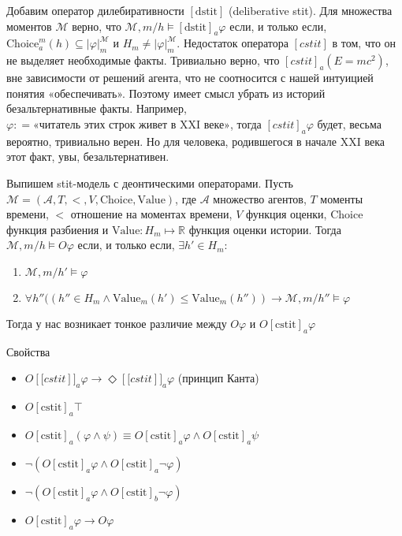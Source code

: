\documentclass[openany]{book}
\theoremstyle{plain}
\theoremstyle{definition}
\begin{document}
Добавим оператор дилебиративности \([\mathrm{dstit}]\) (deliberative stit). Для множества моментов \(\mathcal{M}\) верно, что \(\mathcal{M}, m/h \models [\mathrm{dstit}]_a \varphi\) если, и только если,  \(\mathrm{Choice}_a^m (h) \subseteq |\varphi|_m^{\mathcal{M}}\) и \(H_m \not=|\varphi|_m^{\mathcal{M}} \). Недостаток оператора \([cstit]\) в том, что он не выделяет необходимые факты. Тривиально верно, что \([cstit]_a (E = m c^2)\), вне зависимости от решений агента, что не соотносится с нашей интуицией понятия «обеспечивать». Поэтому имеет смысл убрать из историй безальтернативные факты. Например, \(\varphi : = \text{«читатель этих строк живет в XXI веке»}\), тогда \([cstit]_a \varphi\) будет, весьма вероятно, тривиально верен. Но для человека, родившегося в начале XXI века этот факт, увы, безальтернативен. 

Выпишем stit-модель с деонтическими операторами. Пусть \(\mathcal{M} = (\mathcal{A}, T, <, V, \mathrm{Choice}, \mathrm{Value})\), где \(\mathcal{A}\) множество агентов, \(T\) моменты времени, \(<\) отношение на моментах времени, \(V\) функция оценки, \(\mathrm{Choice}\) функция разбиения и \(\mathrm{Value} : H_m \mapsto \mathbb{R} \) функция оценки истории. Тогда \(\mathcal{M}, m/h \models O \varphi\) если, и только если, \(\exists h' \in H_m\):
\begin{enumerate}
\item\(\mathcal{M}, m/h' \models \varphi\)
\item\(\forall h''((h'' \in H_m \land \mathrm{Value}_m (h') \leq \mathrm{Value}_m (h'')) \to \mathcal{M}, m/h'' \models \varphi\)
\end{enumerate}

Тогда у нас возникает тонкое различие между \(O \varphi\) и \(O [\mathrm{cstit}]_a \varphi\)

Свойства
\begin{itemize}
\item \(O [\mathrm[cstit]]_a \varphi \to \Diamond [\mathrm[cstit]]_a \varphi\) (принцип Канта)
\item \(O [\mathrm{cstit}]_a \top\) 
\item \(O [\mathrm{cstit}]_a (\varphi \land \psi) \equiv O [\mathrm{cstit}]_a \varphi \land O [\mathrm{cstit}]_a \psi\)
\item \(\neg (O [\mathrm{cstit}]_a \varphi \land O [\mathrm{cstit}]_a \neg \varphi)\)
\item \(\neg (O [\mathrm{cstit}]_a \varphi \land O [\mathrm{cstit}]_b \neg \varphi)\)
\item \(O [\mathrm{cstit}]_a \varphi \to O \varphi\)
\end{itemize}
\end{document}
